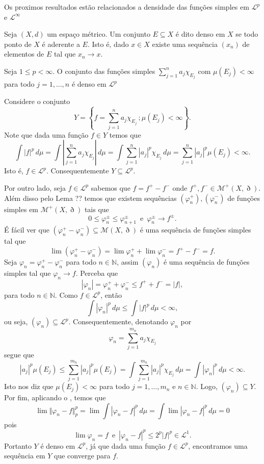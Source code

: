 \documentclass[a4paper, 11pt]{book}
\theoremstyle{definition}
\newcommand{\bN}{\mathbb{N}}
\newcommand{\cM}{\mathcal{M}}
\newcommand{\cL}{\mathcal{L}}
\begin{document}
Os proximos resultados estão relacionados a densidade das funções simples em $\cL^p$ e $\cL^\infty$

\begin{dbox}
    Seja $(X,d)$ um espaço métrico. Um conjunto $E \subseteq X$ é dito denso em $X$ se todo ponto de $X$ é aderente a $E$.
    Isto é, dado $x \in X$ existe uma sequência $(x_n)$ de elementos de $E$ tal que $x_n \to x.$
\end{dbox}

\begin{tbox}
    Seja $1 \leqslant p < \infty$.
    O conjunto das funções simples $\sum_{j=1}^n a_j \chi_{E_j}$ com $\mu(E_j) < \infty$ para todo $j = 1,\dots,n$ é denso em $\cL^p$
\end{tbox}
\begin{prf}
    Considere o conjunto
    \[
        Y = \left\{ f = \sum_{j=1}^{n} a_j \chi_{E_j} \,; \mu(E_j) < \infty \right\}.
    \]
    Note que dada uma função $f \in Y$ temos que
    \[
        \int |f|^p \,d\mu = \int \left| \sum_{j=1}^n a_j \chi_{E_j} \right| \,d\mu = \int \sum_{j=1}^n |a_j|^p \chi_{E_j} \,d\mu = \sum_{j=1}^n |a_j|^p \mu(E_j) < \infty.
    \]
    Isto é, $f \in \cL^p$.
    Consequentemente $Y \subseteq \cL^p$.

    Por outro lado, seja $f \in \cL^p$ sabemos que $f = f^+ - f^-$ onde $f^+, f^- \in \cM^+(X,\eth)$.
    Além disso pelo Lema ?? temos que existem sequências $(\varphi^+_n), (\varphi^-_n)$ de funções simples em $\cM^+(X,\eth)$ tais que
    \[
        0 \leqslant \varphi^\pm_n \leqslant \varphi^\pm_{n+1} \,\text{ e }\, \varphi^\pm_n \to f^\pm.
    \]
    É fácil ver que $(\varphi^+_n - \varphi^-_n) \subseteq \cM(X,\eth)$ é uma sequência de funções simples tal que
    \[
        \lim (\varphi^+_n - \varphi^-_n) = \lim \varphi^+_n + \lim \varphi^-_n = f^+ -f^- = f.
    \]
    Seja $\varphi_n = \varphi^+_n - \varphi^-_n$ para todo $n \in \bN$, assim $(\varphi_n)$ é uma sequência de funções simples tal que $\varphi_n \to f$.
    Perceba que
    \[
        |\varphi_n| = \varphi^+_n + \varphi^-_n \leqslant f^+ + f^- = |f|,
    \]
    para todo $n \in \bN$. Como $f \in \cL^p$, então
    \[
        \int |\varphi_n|^p \, d\mu \leqslant \int |f|^p \,d\mu < \infty,
    \]
    ou seja, $(\varphi_n) \subseteq \cL^p$.
    Consequentemente, denotando $\varphi_n$ por
    \[
        \varphi_n = \sum_{j=1}^{m_n} a_{j} \chi_{E_j}
    \]
    segue que
    \[
        |a_j|^p \mu(E_j) \leqslant \sum_{j=1}^{m_n} |a_j|^p \mu(E_j) = \int \sum_{j=1}^{m_n} |a_j|^p \chi_{E_j} \,d\mu = \int |\varphi_n|^p \,d\mu < \infty.
    \]
    Isto nos diz que $\mu(E_j) < \infty$ para todo $j = 1,\dots,m_n$ e $n \in \bN$. Logo, $(\varphi_n) \subseteq Y$.
    Por fim, aplicando o , temos que
    \[
        \lim \Vert \varphi_n - f \Vert_p^p = \lim \int |\varphi_n - f|^p \,d\mu = \int \lim |\varphi_n - f|^p \,d\mu = 0
    \]
    pois
    \[
        \lim \varphi_n = f \,\text{ e }\, |\varphi_n - f|^p \leqslant 2^p |f|^p \in \cL^1.
    \]
    Portanto $Y$ é denso em $\cL^p$, já que dada uma função $f \in \cL^p$, encontramos uma sequência em $Y$ que converge para $f$.
\end{prf}
\end{document}
